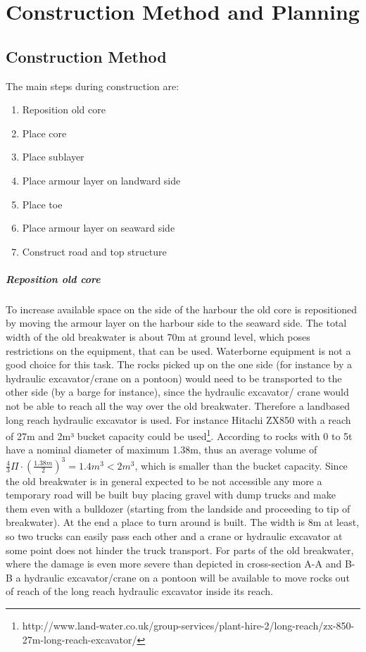 \chapter{Construction Method and Planning}

\section{Construction Method}

The main steps during construction are:
\begin{enumerate}
 \item Reposition old core
 \item Place core
 \item Place sublayer
 \item Place armour layer on landward side
 \item Place toe
 \item Place armour layer on seaward side
 \item Construct road and top structure
\end{enumerate}

\paragraph{Reposition old core}
To increase available space on the side of the harbour the old core is repositioned by moving the armour layer on the harbour side to the seaward side.
The total width of the old breakwater is about 70m at ground level, which poses restrictions on the equipment, that can be used.
Waterborne equipment is not a good choice for this task.
The rocks picked up on the one side (for instance by a hydraulic excavator/crane on a pontoon) would need to be transported to the other side (by a barge for instance), since the hydraulic excavator/ crane would not be able to reach all the way over the old breakwater.
Therefore a landbased long reach hydraulic excavator is used.
For instance Hitachi ZX850 with a reach of 27m and 2m³ bucket capacity could be used\footnote{http://www.land-water.co.uk/group-services/plant-hire-2/long-reach/zx-850-27m-long-reach-excavator/}.
According to \citet{cem} rocks with 0 to 5t have a nominal diameter of maximum 1.38m, thus an average volume of $\frac{4}{3}\Pi \cdot \left(\frac{1.38m}{2}\right)^{3}=1.4m^3<2m^3$, which is smaller than the bucket capacity.
Since the old breakwater is in general expected to be not accessible any more a temporary road will be built buy placing gravel with dump trucks and make them even with a bulldozer (starting from the landside and proceeding to tip of breakwater).
At the end a place to turn around is built.
The width is 8m at least, so two trucks can easily pass each other and a crane or hydraulic excavator at some point does not hinder the truck transport.
For parts of the old breakwater, where the damage is even more severe than depicted in cross-section A-A and B-B a hydraulic excavator/crane on a pontoon will be available to move rocks out of reach of the long reach hydraulic excavator inside its reach.

